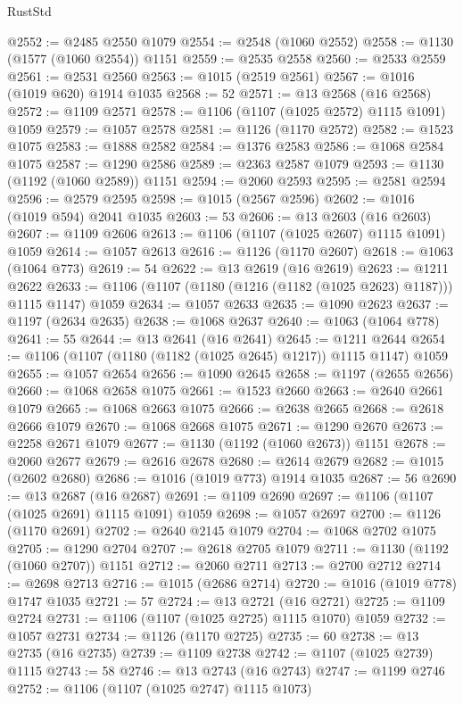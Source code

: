 \begin{lexlean}{RustStd}
\begin{coremodule}
@2552 := @2485 @2550 @1079
@2554 := @2548 (@1060 @2552)
@2558 := @1130 (@1577 (@1060 @2554)) @1151
@2559 := @2535 @2558
@2560 := @2533 @2559
@2561 := @2531 @2560
@2563 := @1015 (@2519 @2561)
@2567 := @1016 (@1019 @620) @1914 @1035
@2568 := 52
@2571 := @13 @2568 (@16 @2568)
@2572 := @1109 @2571
@2578 := @1106 (@1107 (@1025 @2572) @1115 @1091) @1059
@2579 := @1057 @2578
@2581 := @1126 (@1170 @2572)
@2582 := @1523 @1075
@2583 := @1888 @2582
@2584 := @1376 @2583
@2586 := @1068 @2584 @1075
@2587 := @1290 @2586
@2589 := @2363 @2587 @1079
@2593 := @1130 (@1192 (@1060 @2589)) @1151
@2594 := @2060 @2593
@2595 := @2581 @2594
@2596 := @2579 @2595
@2598 := @1015 (@2567 @2596)
@2602 := @1016 (@1019 @594) @2041 @1035
@2603 := 53
@2606 := @13 @2603 (@16 @2603)
@2607 := @1109 @2606
@2613 := @1106 (@1107 (@1025 @2607) @1115 @1091) @1059
@2614 := @1057 @2613
@2616 := @1126 (@1170 @2607)
@2618 := @1063 (@1064 @773)
@2619 := 54
@2622 := @13 @2619 (@16 @2619)
@2623 := @1211 @2622
@2633 := @1106 (@1107 (@1180 (@1216 (@1182 (@1025 @2623) @1187))) @1115 @1147) @1059
@2634 := @1057 @2633
@2635 := @1090 @2623
@2637 := @1197 (@2634 @2635)
@2638 := @1068 @2637
@2640 := @1063 (@1064 @778)
@2641 := 55
@2644 := @13 @2641 (@16 @2641)
@2645 := @1211 @2644
@2654 := @1106 (@1107 (@1180 (@1182 (@1025 @2645) @1217)) @1115 @1147) @1059
@2655 := @1057 @2654
@2656 := @1090 @2645
@2658 := @1197 (@2655 @2656)
@2660 := @1068 @2658 @1075
@2661 := @1523 @2660
@2663 := @2640 @2661 @1079
@2665 := @1068 @2663 @1075
@2666 := @2638 @2665
@2668 := @2618 @2666 @1079
@2670 := @1068 @2668 @1075
@2671 := @1290 @2670
@2673 := @2258 @2671 @1079
@2677 := @1130 (@1192 (@1060 @2673)) @1151
@2678 := @2060 @2677
@2679 := @2616 @2678
@2680 := @2614 @2679
@2682 := @1015 (@2602 @2680)
@2686 := @1016 (@1019 @773) @1914 @1035
@2687 := 56
@2690 := @13 @2687 (@16 @2687)
@2691 := @1109 @2690
@2697 := @1106 (@1107 (@1025 @2691) @1115 @1091) @1059
@2698 := @1057 @2697
@2700 := @1126 (@1170 @2691)
@2702 := @2640 @2145 @1079
@2704 := @1068 @2702 @1075
@2705 := @1290 @2704
@2707 := @2618 @2705 @1079
@2711 := @1130 (@1192 (@1060 @2707)) @1151
@2712 := @2060 @2711
@2713 := @2700 @2712
@2714 := @2698 @2713
@2716 := @1015 (@2686 @2714)
@2720 := @1016 (@1019 @778) @1747 @1035
@2721 := 57
@2724 := @13 @2721 (@16 @2721)
@2725 := @1109 @2724
@2731 := @1106 (@1107 (@1025 @2725) @1115 @1070) @1059
@2732 := @1057 @2731
@2734 := @1126 (@1170 @2725)
@2735 := 60
@2738 := @13 @2735 (@16 @2735)
@2739 := @1109 @2738
@2742 := @1107 (@1025 @2739) @1115
@2743 := 58
@2746 := @13 @2743 (@16 @2743)
@2747 := @1199 @2746
@2752 := @1106 (@1107 (@1025 @2747) @1115 @1073)

\end{coremodule}
\end{lexlean}
